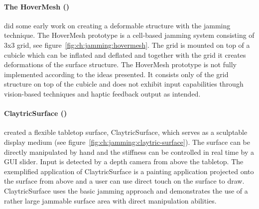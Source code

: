 \paragraph{The HoverMesh (\citeyear{mazzone2004hovermesh})}
\label{ch:jamming:related-work:hci:hovermesh}
\citet{mazzone2004hovermesh} did some early work on creating a deformable structure with the jamming technique. 
The HoverMesh prototype is a cell-based jamming system consisting of 3x3 grid, see figure~\ref{fig:ch:jamming:hovermesh}.
The grid is mounted on top of a cubicle which can be inflated and deflated and together with the grid it creates deformations of the surface structure.
The HoverMesh prototype is not fully implemented according to the ideas presented.
It consists only of the grid structure on top of the cubicle and does not exhibit input capabilities through vision-based techniques and haptic feedback output as intended. 

\paragraph{ClaytricSurface (\citeyear{matoba2012claytricsurface})}
\label{ch:jamming:related-work:hci:claytric}
\citet{matoba2012claytricsurface} created a flexible tabletop surface, ClaytricSurface, which serves as a sculptable display medium (see figure~\ref{fig:ch:jamming:claytric-surface}). 
The surface can be directly manipulated by hand and the stiffness can be controlled in real time by a GUI slider.
Input is detected by a depth camera from above the tabletop.
The exemplified application of ClaytricSurface is a painting application projected onto the surface from above and a user can use direct touch on the surface to draw. 
ClaytricSurface uses the basic jamming approach and demonstrates the use of a rather large jammable surface area with direct manipulation abilities.

